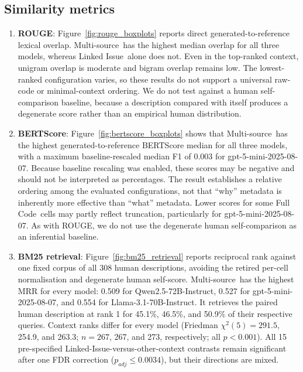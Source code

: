 \documentclass[11pt,a4paper]{article}
\newcommand{\proprietaryLLM}{gpt-5-mini-2025-08-07}
\newcommand{\openSourceLLMOne}{Llama-3.1-70B-Instruct}
\newcommand{\openSourceLLMTwo}{Qwen2.5-72B-Instruct}
\newcommand{\FileCont}{Full Code}
\newcommand{\LinkedIssues}{Linked Issue}
\newcommand{\WithoutFileContents}{Multi-source}
\begin{document}
\subsection{Similarity metrics}

\begin{enumerate}[leftmargin=*,noitemsep,topsep=2pt,parsep=0pt]
    \item \textbf{ROUGE}: Figure~\ref{fig:rouge_boxplots} reports direct
    generated-to-reference lexical overlap. \WithoutFileContents~has the highest median overlap
    for all three models, whereas \LinkedIssues~alone does not. Even in the top-ranked context,
    unigram overlap is moderate and
    bigram overlap remains low. The lowest-ranked configuration varies, so these results do
    not support a universal raw-code or minimal-context ordering. We do not test against a
    human self-comparison baseline, because a description compared with itself produces a
    degenerate score rather than an empirical human distribution.

    \item \textbf{BERTScore}: Figure~\ref{fig:bertscore_boxplots} shows that
    \WithoutFileContents~has the highest generated-to-reference BERTScore median for all three
    models, with a maximum baseline-rescaled median F1 of 0.003 for \proprietaryLLM. Because
    baseline rescaling was enabled, these
    scores may be negative and should not be interpreted as percentages. The result
    establishes a relative ordering among the evaluated configurations, not that ``why''
    metadata is inherently more effective than ``what'' metadata. Lower scores for some
    \FileCont~cells may partly reflect truncation, particularly for \proprietaryLLM. As with
    ROUGE, we do not use the degenerate human self-comparison as an inferential baseline.

    \item \textbf{BM25 retrieval}: Figure~\ref{fig:bm25_retrieval} reports reciprocal rank
    against one fixed corpus of all 308 human descriptions, avoiding the retired per-cell
    normalisation and degenerate human self-score. \WithoutFileContents~has the highest MRR for
    every model: 0.509 for \openSourceLLMTwo, 0.527 for \proprietaryLLM, and 0.554 for
    \openSourceLLMOne. It retrieves the paired human description at rank 1 for 45.1\%, 46.5\%,
    and 50.9\% of their respective queries. Context ranks differ for every model (Friedman
    $\chi^2(5)=291.5$, 254.9, and 263.3; $n=267$, 267, and 273, respectively; all
    $p<0.001$). All 15 pre-specified Linked-Issue-versus-other-context contrasts remain
    significant after one FDR correction ($p_{adj}\leq0.0034$), but their directions are mixed.
\end{enumerate}
\end{document}
